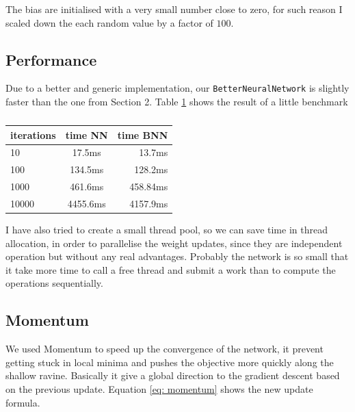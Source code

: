 \documentclass[11pt]{article}
\begin{document}
The bias are initialised with a very small number close to zero, for such reason I scaled down the each random value by a factor of $100$.

\subsection{Performance}
Due to a better and generic implementation, our \texttt{BetterNeuralNetwork} is slightly faster than the one from Section 2. Table \ref{table: performance_NN_BNN} shows the result of a little benchmark
\begin{table}[H]
\centering
  \begin{tabular}{ | l | c | r |}
    \hline
    iterations & time NN & time BNN\\ \hline
    10 & 17.5ms  & 13.7ms \\ \hline
    100 & 134.5ms  & 128.2ms \\ 
    1000 & 461.6ms  & 458.84ms \\ \hline
    10000 & 4455.6ms & 4157.9ms \\ \hline    
  \end{tabular}
  \caption{}
  	\label{table: performance_NN_BNN}

\end{table}
I have also tried to create a small thread pool, so we can save time in thread allocation, in order to parallelise the weight updates, since they are independent operation but without any real advantages. Probably the network is so small that it take more time to call a free thread and submit a work than to compute the operations  sequentially.
\subsection{Momentum}
We used Momentum \cite{Ruder} to speed up the convergence of the network, it prevent getting stuck in local minima and pushes the objective more quickly along the shallow ravine. Basically it give a global direction to the gradient descent based on the previous update. Equation \ref{eq: momentum} shows the new update formula. 
\end{document}
